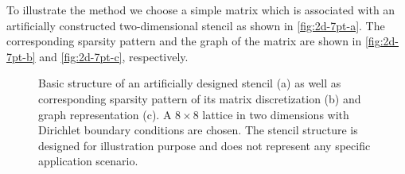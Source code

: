 To illustrate the method we choose a
simple matrix which is associated with an artificially constructed
two-dimensional stencil as shown in \cref{fig:2d-7pt-a}. The
corresponding sparsity pattern and the graph of the matrix are shown
in \cref{fig:2d-7pt-b} and \cref{fig:2d-7pt-c}, respectively.
\begin{figure}[tbp]
	\centering
	\hspace{0.8em}
	\hspace{1em}
	\caption{Basic structure of an artificially designed stencil (a) as well as corresponding sparsity pattern of its matrix discretization (b) and graph representation (c). A $8 \times 8$ lattice in two dimensions with Dirichlet boundary conditions are chosen. The stencil structure is designed for illustration purpose and does not represent any specific application scenario.}
	\label{fig:2d-7pt}
\end{figure}

